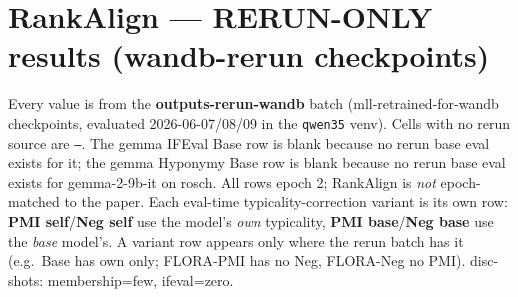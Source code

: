 \documentclass[10pt]{article}
\begin{document}
\section*{RankAlign --- RERUN-ONLY results (wandb-rerun checkpoints)}
{\footnotesize Every value is from the \textbf{outputs-rerun-wandb} batch (mll-retrained-for-wandb
checkpoints, evaluated 2026-06-07/08/09 in the \texttt{qwen35} venv). Cells with no rerun
source are \texttt{---}. The gemma IFEval Base row is blank because no rerun base eval
exists for it; the gemma Hyponymy Base row is blank because no rerun base eval exists for
gemma-2-9b-it on rosch. All rows epoch 2;
RankAlign is \emph{not} epoch-matched to the paper. Each eval-time typicality-correction
variant is its own row: \textbf{PMI self}/\textbf{Neg self} use the model's \emph{own}
typicality, \textbf{PMI base}/\textbf{Neg base} use the \emph{base} model's. A variant
row appears only where the rerun batch has it (e.g.\ Base has own only; FLORA-PMI has no Neg,
FLORA-Neg no PMI). disc-shots: membership=few, ifeval=zero.}
\end{document}
